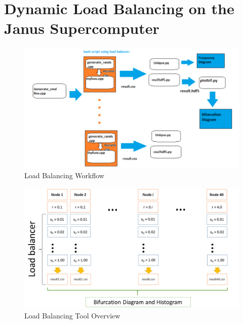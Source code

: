 \section{Dynamic Load Balancing on the Janus Supercomputer}
\begin{figure}[!h]
\caption[Load Balancing Workflow]{Load Balancing Workflow}
	\begin{center}
          \includegraphics[scale=0.5]{figs/workflow.png}
	\end{center}
\end{figure}
\begin{figure}[!h]
\caption[Load Balancing Tool Overview]{Load Balancing Tool Overview}
	\begin{center}
          \includegraphics[scale=0.45]{figs/load_balancer.png}
	\end{center}
\end{figure}

